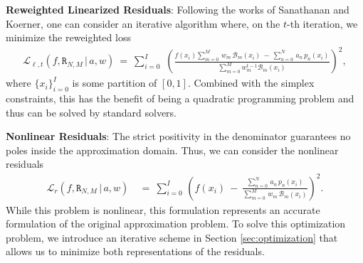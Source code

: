 \documentclass{article}
\newcommand{\RR}{{\mathtt R}}
\begin{document}
\textbf{Reweighted Linearized Residuals}: Following the works of Sanathanan and Koerner, one can consider an iterative algorithm where, on the $t$-th iteration, we minimize the reweighted loss
\begin{align}
    \mathcal{L}_{\ell, t}(f, \RR_{N,M}\, |\, a, w)\ =\ \sum_{i=0}^I\, 
    \, \left(\frac{f(x_i)\sum_{m=0}^M\, w_m\, \mathcal{B}_m(x_i)\ -\ \sum_{n=0}^{N}\, a_n\, p_n(x_i)}{\sum_{m=0}^M w_{m}^{t-1}\mathcal{B}_m(x_i)}\right)^2,
\end{align}
where $\{x_i\}_{i=0}^I$ is some partition of $[0, 1]$. Combined with the simplex constraints, this has the benefit of being a quadratic programming problem and thus can be solved by standard solvers.

\textbf{Nonlinear Residuals}: {The strict positivity in the denominator guarantees no poles inside the approximation domain.} Thus, we can consider the nonlinear residuals
\begin{align}
    \mathcal{L}_{r}(f, \RR_{N, M}\, |\, a, w)\ &=\ \sum_{i=0}^I\, \left(f(x_i)\ -\ \frac{\sum_{n=0}^{N}\, a_n\, p_n(x_i)}{\sum_{m=0}^M\, w_m\, \mathcal{B}_m(x_i)}\right)^2. 
\end{align}
While this problem is nonlinear, this formulation represents an accurate formulation of the original approximation problem. To solve this optimization problem, we introduce an iterative scheme in Section \ref{sec:optimization} that allows us to minimize both representations of the residuals.

\end{document}
